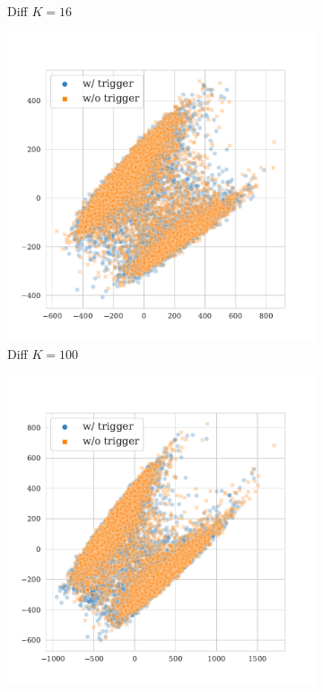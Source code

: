 \begin{figure}[!ht]
\begin{subfigure}{.33\textwidth}
  \caption{Diff $K = 16$}
  \label{fig:sst2_diff_k16_embed}
\end{subfigure}%
\begin{subfigure}{.33\textwidth}
  \centering
  \includegraphics[width=\linewidth]{figures/evaluation_media/sst2-roberta-large-visual-backdoor-diff-prompt-k100-seed42-poison-cf-1648.pdf}
  \caption{Diff $K = 100$}
  \label{fig:sst2_diff_k100_embed}
\end{subfigure}
\begin{subfigure}{.33\textwidth}
  \centering
  \includegraphics[width=\linewidth]{figures/evaluation_media/sst2-roberta-large-visual-backdoor-diff-prompt-k1000-seed42-poison-cf-1648.pdf}

\end{subfigure}
\end{figure}
